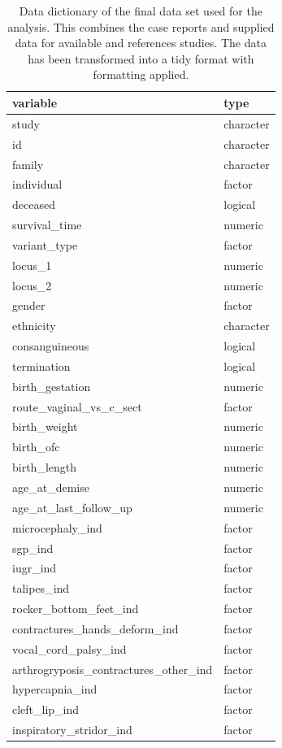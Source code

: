 \documentclass[
  authoryear,
  preprint,
  3p]{elsarticle}
\begin{document}
\hypertarget{tbl-dict}{}
\begin{longtable}{ll}
\caption{\label{tbl-dict}Data dictionary of the final data set used for the analysis. This
combines the case reports and supplied data for available and references
studies. The data has been transformed into a tidy format with
formatting applied. }\tabularnewline

\toprule
variable & type \\ 
\midrule
study & character \\ 
id & character \\ 
family & character \\ 
individual & factor \\ 
deceased & logical \\ 
survival\_time & numeric \\ 
variant\_type & factor \\ 
locus\_1 & numeric \\ 
locus\_2 & numeric \\ 
gender & factor \\ 
ethnicity & character \\ 
consanguineous & logical \\ 
termination & logical \\ 
birth\_gestation & numeric \\ 
route\_vaginal\_vs\_c\_sect & factor \\ 
birth\_weight & numeric \\ 
birth\_ofc & numeric \\ 
birth\_length & numeric \\ 
age\_at\_demise & numeric \\ 
age\_at\_last\_follow\_up & numeric \\ 
microcephaly\_ind & factor \\ 
sgp\_ind & factor \\ 
iugr\_ind & factor \\ 
talipes\_ind & factor \\ 
rocker\_bottom\_feet\_ind & factor \\ 
contractures\_hands\_deform\_ind & factor \\ 
vocal\_cord\_palsy\_ind & factor \\ 
arthrogryposis\_contractures\_other\_ind & factor \\ 
hypercapnia\_ind & factor \\ 
cleft\_lip\_ind & factor \\ 
inspiratory\_stridor\_ind & factor \\ 

\end{longtable}
\end{document}
